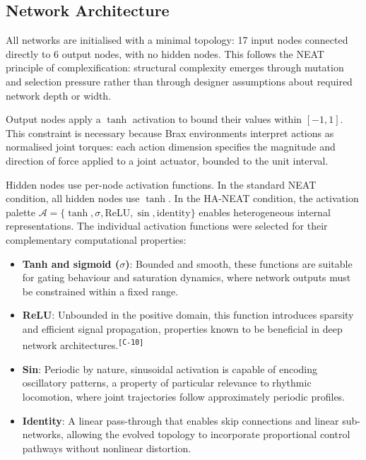 \documentclass[12pt]{article}
\newcommand{\revID}[1]{\textsuperscript{\scriptsize\texttt{[#1]}}}
\newcommand{\revWeak}[2]{\textcolor{revOrange}{#2}\revID{#1}}
\begin{document}
\subsection{Network Architecture}
\label{subsec:network-architecture}

All networks are initialised with a minimal topology: 17 input nodes connected directly to 6 output nodes, with no hidden nodes.
This follows the NEAT principle of complexification: structural complexity emerges through mutation and selection pressure rather than through designer assumptions about required network depth or width.

Output nodes apply a $\tanh$ activation to bound their values within $[-1, 1]$.
This constraint is necessary because Brax environments interpret actions as normalised joint torques: each action dimension specifies the magnitude and direction of force applied to a joint actuator, bounded to the unit interval.

Hidden nodes use per-node activation functions.
In the standard NEAT condition, all hidden nodes use $\tanh$.
In the HA-NEAT condition, the activation palette $\mathcal{A} = \{\tanh, \sigma, \text{ReLU}, \sin, \text{identity}\}$ enables heterogeneous internal representations.
The individual activation functions were selected for their complementary computational properties:

\begin{itemize}
    \item \textbf{Tanh and sigmoid ($\sigma$)}: Bounded and smooth, these functions are suitable for gating behaviour and saturation dynamics, where network outputs must be constrained within a fixed range.
    \item \revWeak{C-10}{\textbf{ReLU}: Unbounded in the positive domain, this function introduces sparsity and efficient signal propagation, properties known to be beneficial in deep network architectures.}
    \item \textbf{Sin}: Periodic by nature, sinusoidal activation is capable of encoding oscillatory patterns, a property of particular relevance to rhythmic locomotion, where joint trajectories follow approximately periodic profiles.
    \item \textbf{Identity}: A linear pass-through that enables skip connections and linear sub-networks, allowing the evolved topology to incorporate proportional control pathways without nonlinear distortion.
\end{itemize}

\end{document}
